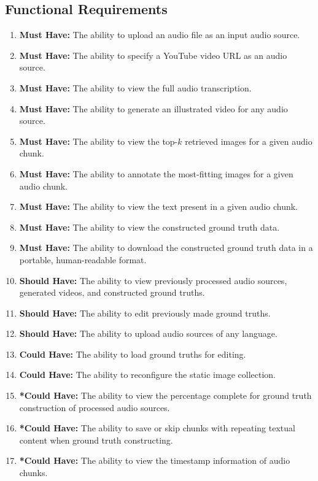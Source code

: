 \documentclass{l4proj}
\begin{document}
\subsection{Functional Requirements}
\begin{enumerate}
    \item \label{req:1} \textbf{Must Have:} The ability to upload an audio file as an input audio source.
    \item \label{req:2} \textbf{Must Have:} The ability to specify a YouTube video URL as an audio source.
    \item \label{req:3} \textbf{Must Have:} The ability to view the full audio transcription.
    \item \label{req:4} \textbf{Must Have:} The ability to generate an illustrated video for any audio source.
    \item \label{req:5} \textbf{Must Have:} The ability to view the top-$k$ retrieved images for a given audio chunk.
    \item \label{req:6} \textbf{Must Have:} The ability to annotate the most-fitting images for a given audio chunk.
    \item \label{req:7} \textbf{Must Have:} The ability to view the text present in a given audio chunk.
    \item \label{req:8} \textbf{Must Have:} The ability to view the constructed ground truth data.
    \item \label{req:9} \textbf{Must Have:} The ability to download the constructed ground truth data in a portable, human-readable format.
    \item \label{req:10} \textbf{Should Have:} The ability to view previously processed audio sources, generated videos, and constructed ground truths.
    \item \label{req:11} \textbf{Should Have:} The ability to edit previously made ground truths.
    \item \label{req:12} \textbf{Should Have:} The ability to upload audio sources of any language.
    \item \label{req:13} \textbf{Could Have:} The ability to load ground truths for editing.
    \item \label{req:14} \textbf{Could Have:} The ability to reconfigure the static image collection.
    \item \label{req:15} \textbf{*Could Have:} The ability to view the percentage complete for ground truth construction of processed audio sources.
    \item \label{req:16} \textbf{*Could Have:} The ability to save or skip chunks with repeating textual content when ground truth constructing.
    \item \label{req:17} \textbf{*Could Have:} The ability to view the timestamp information of audio chunks.
\end{enumerate}
\end{document}
